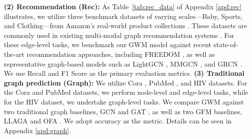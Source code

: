 \begin{itemize}[leftmargin=1em, itemsep=0pt]
\textbf{(2) Recommendation (Rec):} As Table~\ref{tab:rec_data} of Appendix \ref{apd:rec} illustrates, we utilize three benchmark datasets of varying scales—Baby, Sports, and Clothing—from Amazon's real-world product collections \citep{mcauley2015image}. These datasets are commonly used in existing multi-modal graph recommendation systems \citep{mmgcn, grcn}. For these edge-level tasks, we benchmark our GWM model against recent state-of-the-art recommendation approaches, including FREEDOM \citep{zhou2023tale}, as well as representative graph-based models such as LightGCN \citep{he2020lightgcn}, MMGCN \citep{wei2019mmgcn}, and GRCN \citep{wei2020graph}. We use Recall and F1 Score as the primary evaluation metrics.  \textbf{(3) Traditional graph prediction (Graph):}  We utilize Cora \citep{chen2024exploring}, PubMed \citep{chen2024exploring}, and HIV \citep{wu2018moleculenet} datasets. For the Cora and PubMed datasets, we perform node-level and edge-level tasks, while for the HIV dataset, we undertake graph-level tasks. We compare GWM  against two traditional graph baselines, GCN \citep{kipf2016semi} and GAT \citep{velivckovic2017graph}, as well as two GFM baselines, LLAGA \citep{chen2024llaga} and OFA \citep{liu2023one}. We adopt accuracy as the metric. Details can be seen in Appendix \ref{apd:graph}.

\begin{table}[!tbp]
\setlength\tabcolsep{3pt}
\centering
\begin{footnotesize}
\vspace{-4mm}
\caption{\textbf{Multi-modal generation results on Goodreads and Multi-Modal-Paper}. This task is to predict the missing modality based on the given modality. Compared to specific baselines in image generation, GWM achieved the best results.} %
\label{tab:multi-modal generation}
\end{footnotesize}
\end{table}


\end{itemize}
